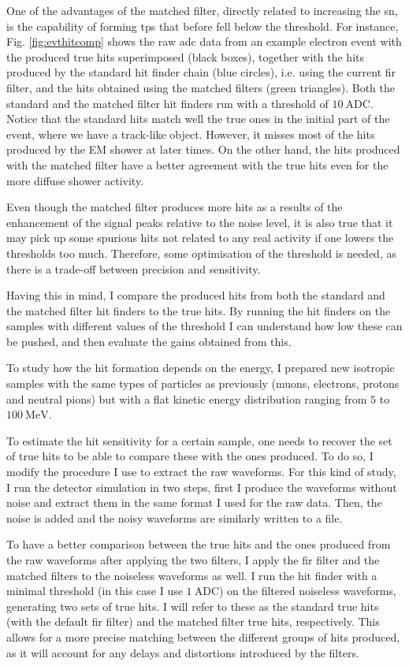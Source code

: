 One of the advantages of the matched filter, directly related to increasing the \gls{sn}, is the capability of forming \gls{tp}s that before fell below the threshold. For instance, Fig. \ref{fig:evthitcomp} shows the raw \gls{adc} data from an example electron event with the produced true hits superimposed (black boxes), together with the hits produced by the standard hit finder chain (blue circles), i.e. using the current \gls{fir} filter, and the hits obtained using the matched filters (green triangles). Both the standard and the matched filter hit finders run with a threshold of $10 \ \mathrm{ADC}$. Notice that the standard hits match well the true ones in the initial part of the event, where we have a track-like object. However, it misses most of the hits produced by the EM shower at later times. On the other hand, the hits produced with the matched filter have a better agreement with the true hits even for the more diffuse shower activity.

Even though the matched filter produces more hits as a results of the enhancement of the signal peaks relative to the noise level, it is also true that it may pick up some spurious hits not related to any real activity if one lowers the thresholds too much. Therefore, some optimisation of the threshold is needed, as there is a trade-off between precision and sensitivity.

Having this in mind, I compare the produced hits from both the standard  and the matched filter hit finders to the true hits. By running the hit finders on the samples with different values of the threshold I can understand how low these can be pushed, and then evaluate the gains obtained from this.

To study how the hit formation depends on the energy, I prepared new isotropic samples with the same types of particles as previously (muons, electrons, protons and neutral pions) but with a flat kinetic energy distribution ranging from $5$ to $100 \ \mathrm{MeV}$.

To estimate the hit sensitivity for a certain sample, one needs to recover the set of true hits to be able to compare these with the ones produced. To do so, I modify the procedure I use to extract the raw waveforms. For this kind of study, I run the detector simulation in two steps, first I produce the waveforms without noise and extract them in the same format I used for the raw data. Then, the noise is added and the noisy waveforms are similarly written to a file.

To have a better comparison between the true hits and the ones produced from the raw waveforms after applying the two filters, I apply the \gls{fir} filter and the matched filters to the noiseless waveforms as well. I run the hit finder with a minimal threshold (in this case I use $1 \ \mathrm{ADC}$) on the filtered noiseless waveforms, generating two sets of true hits. I will refer to these as the standard true hits (with the default \gls{fir} filter) and the matched filter true hits, respectively. This allows for a more precise matching between the different groups of hits produced, as it will account for any delays and distortions introduced by the filters.


